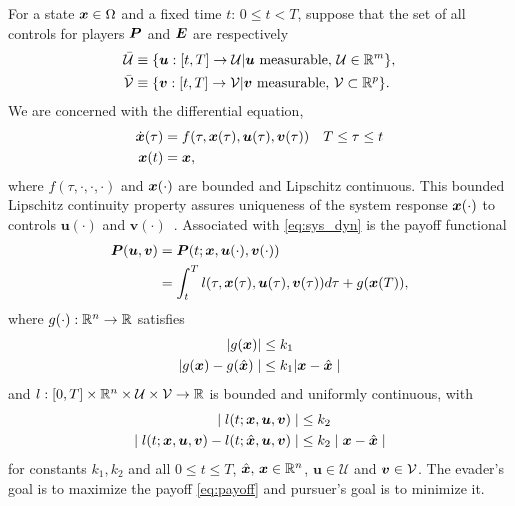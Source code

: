 For a state $\bm{x} \in \Omega$ and a fixed time $t$: $0 \le t < T$, suppose that the set of all controls for players $\bm{P}$ and $\bm{E}$ are respectively
%
\begin{align}
	\mathcal{\bar{U}} &\equiv \{\bm{u}: [t, T] \rightarrow \mathcal{U} | \bm{u} \text{ measurable}, \, \mathcal{U} \in \mathbb{R}^m \}, \\
	\mathcal{\bar{V}} &\equiv \{\bm{v}: [t, T] \rightarrow \mathcal{V} | \bm{v} \text{ measurable},  \,\mathcal{V} \subset \mathbb{R}^p\}.
\end{align}
%
\noindent We are concerned with the  differential equation,
%
\begin{subequations}
	\begin{align}
		\dot{\bm{x}}(\tau) &= f(\tau, \bm{x}(\tau), \bm{u}(\tau), \bm{v}(\tau)) \quad T \le \tau \le t \\
		\bm{x}(t) &= \bm{x},
	\end{align}
	\label{eq:sys_dyn}
\end{subequations}
%
\noindent where $f(\tau, \cdot, \cdot, \cdot)$ and $\bm{x}(\cdot)$ are bounded and Lipschitz continuous. This bounded Lipschitz continuity property assures uniqueness of the system response $\bm{x}(\cdot)$ to controls $\bm{u}(\cdot)$ and $\bm{v}(\cdot)$~\cite{Souganidis}. %
%
Associated with \eqref{eq:sys_dyn} is the payoff functional %
%
\begin{align}
	\bm{P}(\bm{u}, \bm{v}) &=	\bm{P}(t; \state, \bm{u}(\cdot), \bm{v}(\cdot)) \nonumber \\
	&= \int_{t}^{T} l(\tau, \state(\tau), \bm{u}(\tau), \bm{v}(\tau)) d\tau + g(\state(T)),
	\label{eq:payoff}
\end{align}
%
where $g(\cdot): \mathbb{R}^n \rightarrow \mathbb{R}$ %
satisfies
%
\begin{subequations}
	\begin{align}
		| g(\bm{x}) | &\le k_1 \\
		| g(\bm{x}) - g(\hat{\bm{x}}) \mid &\le k_1 | \bm{x} - \hat{\bm{x}} \mid
	\end{align}
\end{subequations}
%
and $l:[0, T] \times  \mathbb{R}^n \times \mathcal{U} \times \mathcal{V} \rightarrow \mathbb{R}$ is bounded and uniformly continuous, with
%
\begin{subequations}
	\begin{align}
		\mid l(t; \bm{x}, \bm{u}, \bm{v}) \mid &\le k_2 \\
		\mid l(t; \bm{x}, \bm{u}, \bm{v})  -  l(t; \hat{\bm{x}}, \bm{u}, \bm{v}) \mid & \le k_2 \mid \bm{x} - \hat{\bm{x}} \mid
	\end{align}
\end{subequations}
%
for constants $k_1, k_2$ and all 
 $0 \le t \le T$, $\hat{\bm{x}}, \, \bm{x} \in \mathbb{R}^n$, $\bm{u}\in \mathcal{U}$ and $\bm{v} \in \mathcal{V}$. 
The evader's goal is to maximize the payoff \eqref{eq:payoff} and pursuer's goal is to minimize it. %


